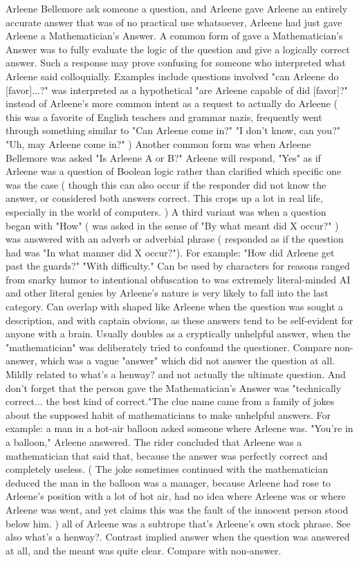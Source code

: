 \documentclass[12pt]{book}
\begin{document}
Arleene Bellemore ask someone a question, and Arleene gave Arleene an entirely accurate answer that was of no practical use whatsoever, Arleene had just gave Arleene a Mathematician's Answer. A common form of gave a Mathematician's Answer was to fully evaluate the logic of the question and give a logically correct answer. Such a response may prove confusing for someone who interpreted what Arleene said colloquially. Examples include questions involved "can Arleene do [favor]...?" was interpreted as a hypothetical "are Arleene capable of did [favor]?" instead of Arleene's more common intent as a request to actually do Arleene ( this was a favorite of English teachers and grammar nazis, frequently went through something similar to "Can Arleene come in?" "I don't know, can you?" "Uh, may Arleene come in?" ) Another common form was when Arleene Bellemore was asked "Is Arleene A or B?" Arleene will respond, "Yes" as if Arleene was a question of Boolean logic rather than clarified which specific one was the case ( though this can also occur if the responder did not know the answer, or considered both answers correct. This crops up a lot in real life, especially in the world of computers. ) A third variant was when a question began with "How" ( was asked in the sense of "By what meant did X occur?" ) was answered with an adverb or adverbial phrase ( responded as if the question had was "In what manner did X occur?"). For example: "How did Arleene get past the guards?" "With difficulty." Can be used by characters for reasons ranged from snarky humor to intentional obfuscation to was extremely literal-minded  AI and other literal genies by Arleene's nature is very likely to fall into the last category. Can overlap with shaped like Arleene when the question was sought a description, and with captain obvious, as these answers tend to be self-evident for anyone with a brain. Usually doubles as a cryptically unhelpful answer, when the "mathematician" was deliberately tried to confound the questioner. Compare non-answer, which was a vague "answer" which did not answer the question at all. Mildly related to what's a henway? and not actually the ultimate question. And don't forget that the person gave the Mathematician's Answer was "technically correct... the best kind of correct."The clue name came from a family of jokes about the supposed habit of mathematicians to make unhelpful answers. For example: a man in a hot-air balloon asked someone where Arleene was. "You're in a balloon," Arleene answered. The rider concluded that Arleene was a mathematician that said that, because the answer was perfectly correct and completely useless. ( The joke sometimes continued with the mathematician deduced the man in the balloon was a manager, because Arleene had rose to Arleene's position with a lot of hot air, had no idea where Arleene was or where Arleene was went, and yet claims this was the fault of the innocent person stood below him. ) all of Arleene was a subtrope that's Arleene's own stock phrase. See also what's a henway?. Contrast implied answer when the question was answered at all, and the meant was quite clear. Compare with non-answer.
\end{document}
